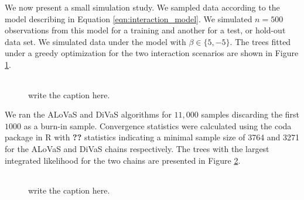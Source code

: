 We now present a small simulation study. We sampled data according to the model describing in Equation \ref{eqn:interaction_model}. We simulated $n=500$ observations from this model for a training and another for a test, or hold-out data set. We simulated data under the model with $\beta \in \{5, -5\}$. The trees fitted under a greedy optimization for the two interaction scenarios are shown in Figure \ref{fig:interaction_trees}. 

\begin{figure}
\begin{center} 
\begin{tabular}{cc}
\end{tabular}
\caption{write the caption here.}
\label{fig:interaction_trees}
\end{center}
\end{figure} 

We ran the ALoVaS and DiVaS algorithms for $11,000$ samples discarding the first $1000$ as a burn-in sample. Convergence statistics were calculated using the coda package in R with \textbf{??} statistics indicating a minimal sample size of 3764 and 3271 for the ALoVaS and DiVaS chains respectively. The trees with the largest integrated likelihood for the two chains are presented in Figure \ref{fig:chain_max_interaction_tree}.  

\begin{figure}
\begin{center} 
\begin{tabular}{cc}
\end{tabular}
\caption{write the caption here.}
\label{fig:chain_max_interaction_tree}
\end{center}
\end{figure} 

